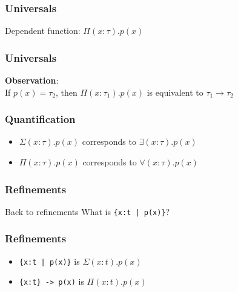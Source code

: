 \documentclass[usenames,dvipsnames]{beamer}
\begin{document}
\begin{frame}
  \frametitle{Universals}

  Dependent function: $\Pi(x:\tau). p(x)$

  \begin{prooftree}
  \end{prooftree}

  \begin{prooftree}
  \end{prooftree}
\end{frame}


\begin{frame}
  \frametitle{Universals}

  \textbf{Observation}: \\
  If $p(x) = \tau_2$, then $\Pi(x:\tau_1).p(x)$ is equivalent to $\tau_1
  \rightarrow \tau_2$
\end{frame}


\begin{frame}
  \frametitle{Quantification}

  \begin{itemize}
    \item $\Sigma(x:\tau).p(x)$ corresponds to $\exists (x:\tau) . p(x)$
    \item $\Pi(x:\tau).p(x)$ corresponds to $\forall (x:\tau) . p(x)$
  \end{itemize}
\end{frame}


\begin{frame}
  \frametitle{Refinements}

  \begin{block}{Back to refinements}
    What is \texttt{\{x:t | p(x)\}}?
  \end{block}
\end{frame}


\begin{frame}
  \frametitle{Refinements}

  \begin{itemize}
    \item \texttt{\{x:t | p(x)\}} is $\Sigma(x:t).p(x)$
    \item \texttt{\{x:t\} -> p(x)} is $\Pi(x:t).p(x)$
  \end{itemize}
\end{frame}
\end{document}
